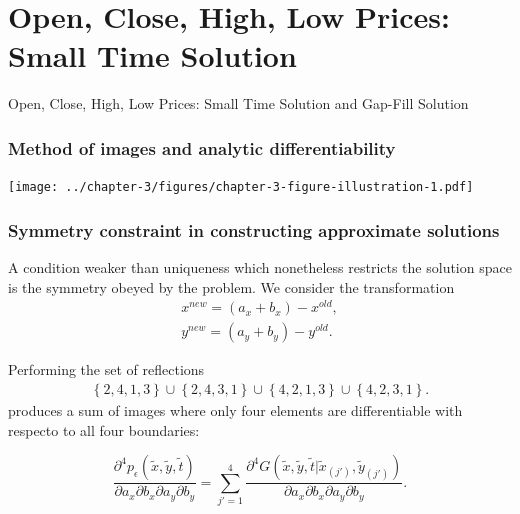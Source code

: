 \documentclass{beamer}
\begin{document}
\section{Open, Close, High, Low Prices: Small Time Solution}
\begin{frame}
Open, Close, High, Low Prices: Small Time Solution and Gap-Fill Solution
\end{frame}
\begin{frame}
  \frametitle{Method of images and analytic differentiability}
  \centering
  \texttt{[image: ../chapter-3/figures/chapter-3-figure-illustration-1.pdf]}
\end{frame}
\begin{frame}
  \frametitle{Symmetry constraint in constructing approximate solutions}

  A condition weaker than uniqueness which nonetheless restricts the
solution space is the symmetry obeyed by the problem. We consider the transformation
\begin{align*}
  x^{new} = (a_x + b_x) - x^{old}, \\
  y^{new} = (a_y + b_y) - y^{old}.
\end{align*}

Performing the set of reflections
\begin{align*}
  \left\{ 2,4,1,3 \right\} \cup \left\{ 2,4,3,1 \right\} \cup \left\{ 4,2,1,3 \right\} \cup \left\{ 4,2,3,1 \right\}. 
\end{align*}
produces a sum of images where only four elements are differentiable
with respecto to all four boundaries:

\[
  \frac{\partial^4 p_\epsilon(\tilde{x}, \tilde{y}, \tilde{t})}{\partial a_x \partial b_x \partial a_y \partial b_y}  = \sum_{j'=1}^{4}
                                                                                                                        \frac{\partial^4G(\tilde{x},\tilde{y},\tilde{t}|\tilde{x}_{(j')},\tilde{y}_{(j')})}{\partial a_x \partial b_x \partial a_y \partial b_y}.
\]

\end{frame}
\end{document}

